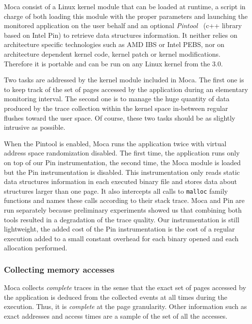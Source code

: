 \gls{Moca} consist of a Linux kernel module that can be loaded at runtime,  a script
in charge of both loading this module with the proper parameters and launching the
monitored application on the user behalf
and an optional \emph{Pintool}~\cite{Luk05Pin} (c++ library based on Intel Pin) to retrieve data
structures information.
It neither relies on architecture specific
technologies such as AMD IBS or Intel PEBS, nor on architecture dependent kernel
code, kernel patch or kernel modifications.
Therefore it is portable and can be run on any Linux kernel
from the $3.0$.

Two tasks are addressed by the kernel module included in \gls{Moca}. The first one is
to keep track of the set of pages accessed by the application during an elementary monitoring
interval. The second one is to manage the huge quantity of data produced
by the trace collection within the kernel space in-between regular flushes toward
the user space. Of course, these two tasks should be as slightly intrusive as possible.

When the Pintool is enabled, \gls{Moca} runs the application twice with virtual
address space randomization disabled. The first time, the application runs only
on top of our Pin instrumentation, the second time, the \gls{Moca} module is loaded but the
Pin instrumentation is disabled. This instrumentation only reads static data
structures information in each executed binary file and stores data about structures larger than
one page. It also intercepts all calls to \texttt{malloc} family functions
and names these calls according to their stack trace.
\gls{Moca} and Pin are run separately because preliminary experiments showed us that combining both
tools resulted in a degradation of the trace quality. Our instrumentation is still lightweight, the
added cost of the Pin instrumentation is the cost of a regular execution 
added to a small constant overhead for each binary opened and each allocation performed.

\subsubsection{Collecting memory accesses}

\gls{Moca} collects \emph{complete} traces in the sense that the exact set
of pages accessed by the application is deduced from the collected events
at all times during the execution. Thus, it is \emph{complete} at the page granularity.
Other information such as exact addresses and access times are a sample of
the set of all the accesses.


